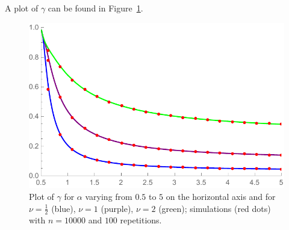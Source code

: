 \begin{theorem}
\end{theorem}

\noindent
A plot of $\gamma$ can be found in Figure~\ref{fig:gamma}.


\begin{figure}[h!]
    \centering
    \includegraphics[scale=0.6]{figures/cn10000nu0512rep100a05to5.pdf}
    \caption{Plot of $\gamma$ for $\alpha$ varying from $0.5$ to $5$ on the horizontal axis and 
    for $\nu=\frac{1}{2}$ (blue), $\nu=1$ (purple), $\nu=2$ (green); simulations (red dots) with $n=10000$ and $100$ repetitions.\label{fig:gamma}}
\end{figure}

